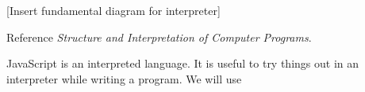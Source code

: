 [Insert fundamental diagram for interpreter]

Reference \textit{Structure and Interpretation of Computer Programs}.

JavaScript is an interpreted language. It is useful to try things out in an interpreter while writing a program. We will use

%
%
%
%
%
%
%
%
